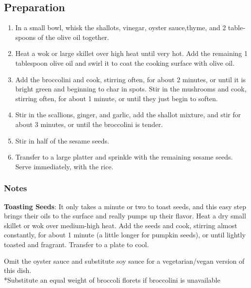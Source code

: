 \subsection{Preparation}
\begin{enumerate}
    \item In a small bowl, whisk the shallots, vinegar, oyster sauce,thyme, and 2 table­spoons of the olive oil together.
    \item Heat a wok or large skillet over high heat until very hot. Add the remaining 1 tablespoon olive oil and swirl it to coat the cooking surface with olive oil.
    \item Add the broccolini and cook, stirring often, for about 2 minutes, or until it is bright green and beginning to char in spots. Stir in the mushrooms and cook, stirring often, for about 1 minute, or until they just begin to soften.
    \item Stir in the scallions, ginger, and garlic, add the shallot mixture, and stir for about 3 min­utes, or until the broccolini is tender.
    \item Stir in half of the sesame seeds.
    \item Transfer to a large platter and sprinkle with the remaining sesame seeds. Serve immediately, with the rice.
\end{enumerate}

\subsubsection{Notes}
\textbf{Toasting Seeds}: It only takes a minute or two to toast seeds, and this easy step brings their oils to the surface and really pumps up their flavor. Heat a dry small skillet or wok over medium-high heat. Add the seeds and cook, stirring almost constantly, for about 1 minute (a little longer for pumpkin seeds), or until lightly toasted and fragrant. Transfer to a plate to cool.

\noindent *Omit the oyster sauce and substitute soy sauce for a vegetarian/vegan version of this dish.\\
\noindent **Substitute an equal weight of broccoli florets if broccolini is unavailable

